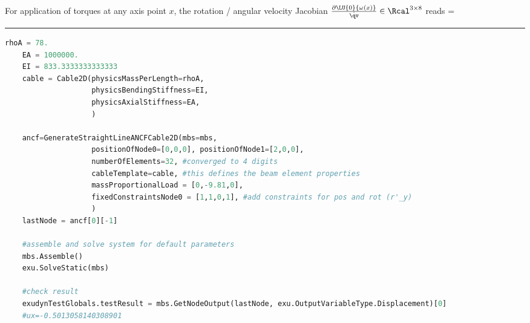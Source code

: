     For application of torques at any axis point $x$, the rotation / angular velocity Jacobian $\frac{\partial \LU{0}{\omega(x)}}{\dot \qv} \in \Rcal^{3 \times 8}$ reads
    \be
       = 
    \ee
\vspace{6pt}\par\noindent\rule{\textwidth}{0.4pt}
\label{miniExample_ObjectANCFCable2D}
\pythonstyle
\begin{lstlisting}[language=Python, firstnumber=1]
    rhoA = 78.
    EA = 1000000.
    EI = 833.3333333333333
    cable = Cable2D(physicsMassPerLength=rhoA, 
                    physicsBendingStiffness=EI, 
                    physicsAxialStiffness=EA, 
                    )

    ancf=GenerateStraightLineANCFCable2D(mbs=mbs,
                    positionOfNode0=[0,0,0], positionOfNode1=[2,0,0],
                    numberOfElements=32, #converged to 4 digits
                    cableTemplate=cable, #this defines the beam element properties
                    massProportionalLoad = [0,-9.81,0],
                    fixedConstraintsNode0 = [1,1,0,1], #add constraints for pos and rot (r'_y)
                    )
    lastNode = ancf[0][-1]

    #assemble and solve system for default parameters
    mbs.Assemble()
    exu.SolveStatic(mbs)

    #check result
    exudynTestGlobals.testResult = mbs.GetNodeOutput(lastNode, exu.OutputVariableType.Displacement)[0]
    #ux=-0.5013058140308901

\end{lstlisting}

